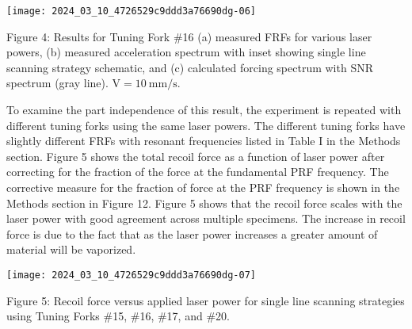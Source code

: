 \documentclass[10pt]{article}
\begin{document}
\begin{center}
\texttt{[image: 2024\_03\_10\_4726529c9ddd3a76690dg-06]}
\end{center}

Figure 4: Results for Tuning Fork \#16 (a) measured FRFs for various laser powers, (b) measured acceleration spectrum with inset showing single line scanning strategy schematic, and (c) calculated forcing spectrum with SNR spectrum (gray line). $\mathrm{V}=10 \mathrm{~mm} / \mathrm{s}$.

To examine the part independence of this result, the experiment is repeated with different tuning forks using the same laser powers. The different tuning forks have slightly different FRFs with resonant frequencies listed in Table I in the Methods section. Figure 5 shows the total recoil force as a function of laser power after correcting for the fraction of the force at the fundamental PRF frequency. The corrective measure for the fraction of force at the PRF frequency is shown in the Methods section in Figure 12. Figure 5 shows that the recoil force scales with the laser power with good agreement across multiple specimens. The increase in recoil force is due to the fact that as the laser power increases a greater amount of material will be vaporized.

\begin{center}
\texttt{[image: 2024\_03\_10\_4726529c9ddd3a76690dg-07]}
\end{center}

Figure 5: Recoil force versus applied laser power for single line scanning strategies using Tuning Forks \#15, \#16, \#17, and \#20.
\end{document}
